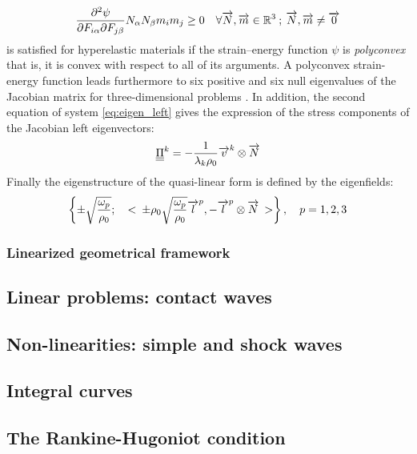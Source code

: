 \begin{equation}
  \label{eq:legendre-hadamard}
  \ddrond{\psi}{F_{i\alpha}}{F_{j\beta}}N_\alpha N_\beta m_i m_j \geq 0 \quad \forall \vect{N},\vect{m} \in \Rbb^3 \: ; \: \vect{N},\vect{m} \ne \vect{0}
\end{equation}
is satisfied for hyperelastic materials if the strain--energy function $\psi$ is \textit{polyconvex} \cite[Read it!]{Ball} that is, it is convex with respect to all of its arguments. A polyconvex strain-energy function leads furthermore to six positive and six null eigenvalues of the Jacobian matrix for three-dimensional problems \cite{Kluth}.
In addition, the second equation of system \eqref{eq:eigen_left} gives the expression of the stress components of the Jacobian left eigenvectors:
\begin{equation}
  \label{eq:stress_left_eigen}
  {\underline{\underline{\Pi}}}^k = -\frac{1}{\lambda_k\rho_0}{\overrightarrow{v}}^k\otimes{\overrightarrow{N}}
\end{equation}
Finally the eigenstructure of the quasi-linear form is defined by the eigenfields:
\begin{equation}
  \label{eq:HE_eigenfields}
    \left\lbrace \pm \sqrt{\frac{\omega_p}{\rho_0}} ; \quad <\: \pm \rho_0\sqrt{\frac{\omega_p}{\rho_0}} {\overrightarrow{l}}^p , -{\overrightarrow{l}}^p\otimes {\overrightarrow{N}} \:>  \right\rbrace ,\quad p=1,2,3
\end{equation}

\subsubsection*{Linearized geometrical framework}

\subsection{Linear problems: contact waves}
\subsection{Non-linearities: simple and shock waves}
\subsection{Integral curves}
\subsection{The Rankine-Hugoniot condition}


